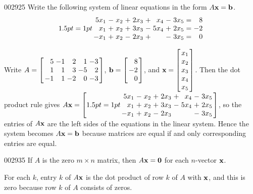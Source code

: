 \begin{example}{}{002925}
Write the following system of linear equations in the form $A\textbf{x} = \textbf{b}$.
\begin{equation*}
\arraycolsep=1pt
\begin{array}{rrrrrrrrrrr}
5x_{1} & - & x_{2} & + & 2x_{3} & + & x_{4} & - & 3x_{5} & = & 8 \\
x_{1} & + & x_{2} & + & 3x_{3} & - & 5x_{4} & + & 2x_{5} & = & -2 \\
-x_{1} & + & x_{2} & - & 2x_{3} & + & & - & 3x_{5} & = & 0
\end{array}
\end{equation*}
\begin{solution}
  Write $A = \leftB \begin{array}{rrrrr}
 5 & -1 & 2 & 1 & -3 \\
 1 & 1 & 3 & -5 & 2 \\
 -1 & 1 & -2 & 0 & -3
  \end{array} \rightB$, $\vect{b} = \leftB \begin{array}{r}
  8 \\
  -2 \\
  0
  \end{array} \rightB$, and $\vect{x} = \leftB \begin{array}{c}
  x_{1} \\
  x_{2} \\
  x_{3} \\
  x_{4} \\
  x_{5}
  \end{array} \rightB$. Then the dot product rule gives $A\vect{x} = \leftB \arraycolsep=1pt \begin{array}{rrrrrrrrr}
 5x_{1} & - & x_{2} & + & 2x_{3} & + & x_{4} & - & 3x_{5} \\
 x_{1} & + & x_{2} & + & 3x_{3} & - & 5x_{4} & + & 2x_{5} \\
 -x_{1} & + & x_{2} & - & 2x_{3} & & & - & 3x_{5}
 \end{array} \rightB$, so the entries of $A\textbf{x}$ are the left sides of the equations in the linear system. Hence the system becomes $A\textbf{x} = \textbf{b}$ because matrices are equal if and only corresponding entries are equal.
\end{solution}
\end{example}

\begin{example}{}{002935}
If $A$ is the zero $m \times n$ matrix, then $A\textbf{x} = \textbf{0}$ for each $n$-vector $\textbf{x}$.


\begin{solution}
  For each $k$, entry $k$ of $A\textbf{x}$ is the dot product of row $k$ of $A$ with $\textbf{x}$, and this is zero because row $k$ of $A$ consists of zeros.
\end{solution}
\end{example}

